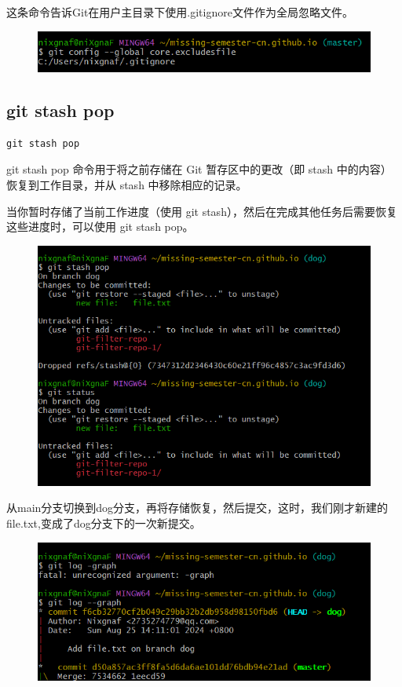 \documentclass{article}
\begin{document}
\noindent 这条命令告诉Git在用户主目录下使用.gitignore文件作为全局忽略文件。
\begin{figure}[h]
    \centering
    \includegraphics[width=1\linewidth]{picture/gitconfig.png}
\end{figure}

\subsection{git stash pop}
\begin{lstlisting}
git stash pop
\end{lstlisting}

\noindent git stash pop 命令用于将之前存储在 Git 暂存区中的更改（即 stash 中的内容）恢复到工作目录，并从 stash 中移除相应的记录。

\noindent 当你暂时存储了当前工作进度（使用 git stash），然后在完成其他任务后需要恢复这些进度时，可以使用 git stash pop。
\begin{figure}[h]
    \centering
    \includegraphics[width=1\linewidth]{picture/gitpop1.png}
\end{figure}

\noindent  
从main分支切换到dog分支，再将存储恢复，然后提交，这时，我们刚才新建的file.txt,变成了dog分支下的一次新提交。
\begin{figure}[h]
    \centering
    \includegraphics[width=1\linewidth]{picture/gitpop2.png}
\end{figure}
\end{document}
